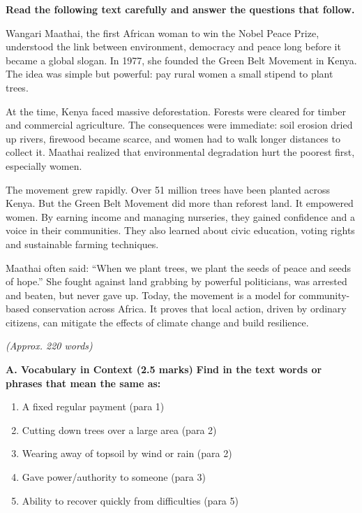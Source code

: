 \documentclass[11pt]{article}
\begin{document}
\begin{exercice}
\textbf{Read the following text carefully and answer the questions that follow.}
\begin{textebox}
Wangari Maathai, the first African woman to win the Nobel Peace Prize, understood the link between environment, democracy and peace long before it became a global slogan. In 1977, she founded the Green Belt Movement in Kenya. The idea was simple but powerful: pay rural women a small stipend to plant trees. 

At the time, Kenya faced massive deforestation. Forests were cleared for timber and commercial agriculture. The consequences were immediate: soil erosion dried up rivers, firewood became scarce, and women had to walk longer distances to collect it. Maathai realized that environmental degradation hurt the poorest first, especially women.

The movement grew rapidly. Over 51 million trees have been planted across Kenya. But the Green Belt Movement did more than reforest land. It empowered women. By earning income and managing nurseries, they gained confidence and a voice in their communities. They also learned about civic education, voting rights and sustainable farming techniques.

Maathai often said: “When we plant trees, we plant the seeds of peace and seeds of hope.” She fought against land grabbing by powerful politicians, was arrested and beaten, but never gave up. Today, the movement is a model for community-based conservation across Africa. It proves that local action, driven by ordinary citizens, can mitigate the effects of climate change and build resilience.

\textit{(Approx. 220 words)}
\end{textebox}

\textbf{A. Vocabulary in Context (2.5 marks)}
\textbf{Find in the text words or phrases that mean the same as:}
\begin{enumerate}
\item A fixed regular payment (para 1)
\item Cutting down trees over a large area (para 2)
\item Wearing away of topsoil by wind or rain (para 2)
\item Gave power/authority to someone (para 3)
\item Ability to recover quickly from difficulties (para 5)
\end{enumerate}


\end{exercice}
\end{document}
